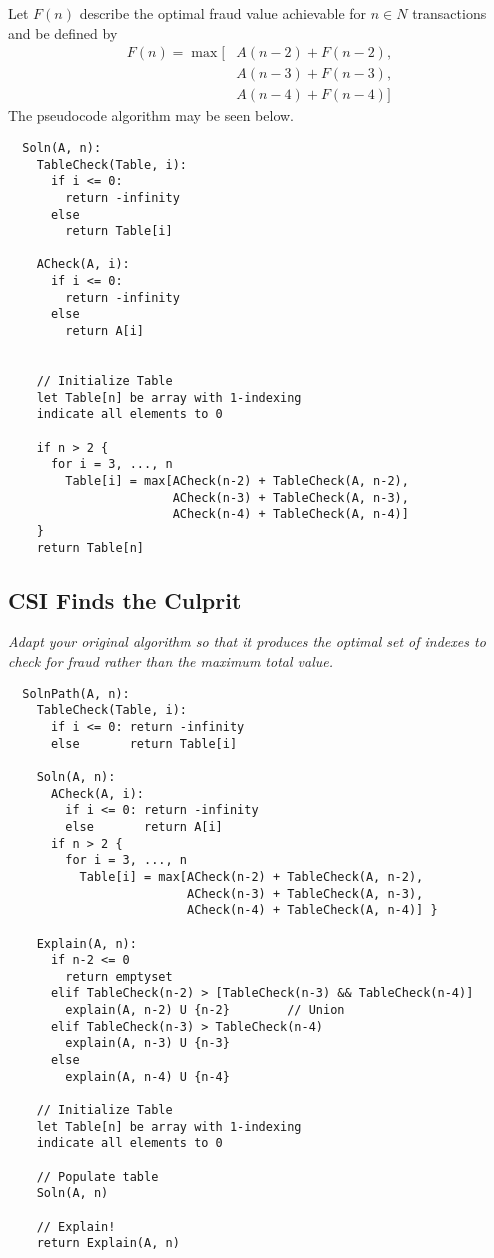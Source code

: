 \documentclass[11pt, oneside]{article}   	%
\theoremstyle{definition}
\theoremstyle{remark}
\begin{document}
Let $F(n)$ describe the optimal fraud value achievable for $n\in {N}$ transactions and be defined by
\begin{align*}
	F(n) = \max[&A(n-2) + F(n-2), \\
	& A(n-3) + F(n-3), \\
	& A(n-4) + F(n-4)]
\end{align*}
The pseudocode algorithm may be seen below.
\cleardoublepage
\begin{verbatim}
  Soln(A, n):
    TableCheck(Table, i):
      if i <= 0:
        return -infinity
      else
        return Table[i]
    
    ACheck(A, i):
      if i <= 0:
        return -infinity
      else
        return A[i]
    
    
    // Initialize Table
    let Table[n] be array with 1-indexing
    indicate all elements to 0
    
    if n > 2 {
      for i = 3, ..., n
        Table[i] = max[ACheck(n-2) + TableCheck(A, n-2),
                       ACheck(n-3) + TableCheck(A, n-3),
                       ACheck(n-4) + TableCheck(A, n-4)]
    }
    return Table[n]
\end{verbatim}
\clearpage
\subsection{CSI Finds the Culprit}
\label{sec-2-1}
\textit{Adapt your original algorithm so that it produces the optimal set of indexes to check for fraud rather than the maximum total value.}
\begin{verbatim}
  SolnPath(A, n):
    TableCheck(Table, i):
      if i <= 0: return -infinity
      else       return Table[i]
            
    Soln(A, n):  
      ACheck(A, i):
        if i <= 0: return -infinity
        else       return A[i]
      if n > 2 {
        for i = 3, ..., n
          Table[i] = max[ACheck(n-2) + TableCheck(A, n-2),
                         ACheck(n-3) + TableCheck(A, n-3),
                         ACheck(n-4) + TableCheck(A, n-4)] }
    
    Explain(A, n):
      if n-2 <= 0
        return emptyset
      elif TableCheck(n-2) > [TableCheck(n-3) && TableCheck(n-4)]
        explain(A, n-2) U {n-2}        // Union
      elif TableCheck(n-3) > TableCheck(n-4)
        explain(A, n-3) U {n-3}
      else
        explain(A, n-4) U {n-4}
    
    // Initialize Table
    let Table[n] be array with 1-indexing
    indicate all elements to 0
    
    // Populate table
    Soln(A, n)
    
    // Explain!
    return Explain(A, n)
\end{verbatim}
\end{document}
